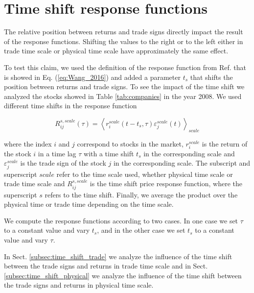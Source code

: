 \section{Time shift response functions}\label{sec:time_shift}

The relative position between returns and trade signs directly impact the
result of the response functions. Shifting the values to the right or to the
left either in trade time scale or physical time scale have approximately the
same effect.

To test this claim, we used the definition of the response function from Ref.
\cite{Wang_2016_cross} that is showed in Eq. (\ref{eq:Wang_2016}) and added
a parameter $t_{s}$ that shifts the position between returns and trade signs.
To see the impact of the time shift we analyzed the stocks showed in Table
\ref{tab:companies} in the year 2008. We used different time shifts in the
response function

\begin{equation}\label{eq:time_shift_general}
    R_{ij}^{s, scale}\left(\tau\right)=\left\langle r^{scale}_{i}
    \left(t-t_{s},\tau\right) \varepsilon^{scale}_{j}
    \left(t\right)\right\rangle _{scale}
\end{equation}

where the index $i$ and $j$ correspond to stocks in the market, $r^{scale}_{i}$
is the return of the stock $i$ in a time lag $\tau$ with a time shift
$t_{s}$ in the corresponding scale and $\varepsilon^{scale}_{j}$ is the
trade sign of the stock $j$ in the corresponding scale. The subscript and
superscript $scale$ refer to the time scale used, whether physical time scale
or trade time scale and $R_{ij}^{s,scale}$ is the time shift price response
function, where the superscript $s$ refers to the time shift. Finally, we
average the product over the physical time or trade time depending on the time
scale.

We compute the response functions according to two cases. In one case we set
$\tau$ to a constant value and vary $t_{s}$, and in the other case we set
$t_{s}$ to a constant value and vary $\tau$.

In Sect. \ref{subsec:time_shift_trade} we analyze the influence of the time
shift between the trade signs and returns in trade time scale and in Sect.
\ref{subsec:time_shift_physical} we analyze the influence of the time shift
between the trade signs and returns in physical time scale.


